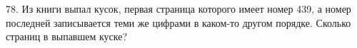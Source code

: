 78. Из книги выпал кусок, первая страница которого имеет номер 439, а номер последней записывается теми же цифрами в каком-то другом порядке. Сколько страниц в выпавшем куске?\\
